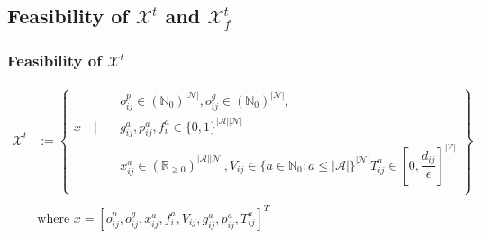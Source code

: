 \subsection{Feasibility of $\mathcal{X}^t$ and $\mathcal{X}^t_f$ }\label{appendix:feasibility_x_xf_time}

\subsubsection{Feasibility of $\mathcal{X}^t$}

\begin{equation}
	\begin{aligned}
		\mathcal{X}^t &:= \left\{
		\begin{aligned}
			&  o^p_{ij} \in (\mathbb{N}_0)^{|\mathcal{N}|}, o^g_{ij} \in (\mathbb{N}_0)^{|\mathcal{N}|},  \\
			x \quad  \Bigg| \quad&g^a_{ij}, p^a_{ij},f^a_{i} \in \{0,1\}^{|\mathcal{A}||\mathcal{N}|} \\%
			&  x_{ij}^a\in (\mathbb{R}_{\ge 0})^{|\mathcal{A}||\mathcal{N}|}, V_{ij} \in \{ a \in \mathbb{N}_0 : a \leq |\mathcal{A}| \}^{|\mathcal{N}|} T^a_{ij} \in [0, \dfrac{d_{ij}}{\epsilon}]^{|\mathcal{V}|}\\%
		\end{aligned}
		\right\}\\
		&\\
		&\text{where }  x = [o^p_{ij},o^g_{ij}, x_{ij}^a, f^a_{i}, V_{ij} , g^a_{ij}, p^a_{ij}, T^a_{ij}]^T
	\end{aligned}
\end{equation}


